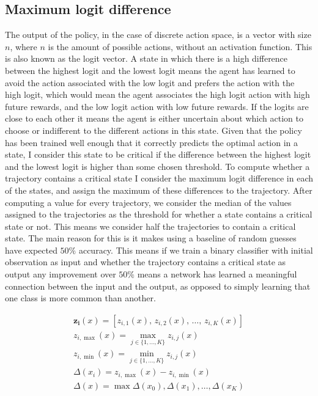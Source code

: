 \documentclass[UKenglish]{uiomasterthesis}
\begin{document}
\subsection{Maximum logit difference}
The output of the policy, in the case of discrete action space, is a vector with size $n$, where $n$ is the amount of possible actions, without an activation function. This is also known as the logit vector. A state in which there is a high difference between the highest logit and the lowest logit means the agent has learned to avoid the action associated with the low logit and prefers the action with the high logit, which would mean the agent associates the high logit action with high future rewards, and the low logit action with low future rewards. If the logits are close to each other it means the agent is either uncertain about which action to choose or indifferent to the different actions in this state. Given that the policy has been trained well enough that it correctly predicts the optimal action in a state, I consider this state to be critical if the difference between the highest logit and the lowest logit is higher than some chosen threshold.
To compute whether a trajectory contains a critical state I consider the maximum logit difference in each of the states, and assign the maximum of these differences to the trajectory. After computing a value for every trajectory, we consider the median of the values assigned to the trajectories as the threshold for whether a state contains a critical state or not. This means we consider half the trajectories to contain a critical state. The main reason for this is it makes using a baseline of random guesses have expected $50\%$ accuracy. This means if we train a binary classifier with initial observation as input and whether the trajectory contains a critical state as output any improvement over $50\%$ means a network has learned a meaningful connection between the input and the output, as opposed to simply learning that one class is more common than another.

\begin{gather*}
    \mathbf{z_i}(x) = \left[z_{i,1}(x),\, z_{i,2}(x),\, \dots,\, z_{i,K}(x)\right]\\
    z_{i,\max}(x) = \max_{j \in \{1,\dots,K\}} z_{i,j}(x)\\
    z_{i,\min}(x) = \min_{j \in \{1,\dots,K\}} z_{i,j}(x)\\
\Delta(x_i) = z_{i,\max}(x) - z_{i,\min}(x)\\
\Delta(x) = \max{\Delta(x_0),\Delta(x_1), \dots, \Delta(x_K)}
\end{gather*}
\end{document}
